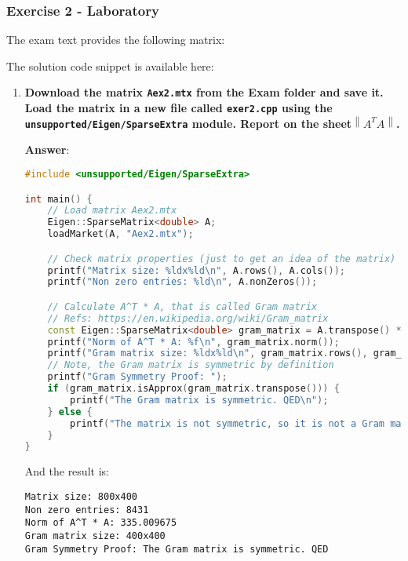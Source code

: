 \newpage

\subsubsection*{Exercise 2 - Laboratory}

The exam text provides the following matrix:
\begin{center}
\end{center}
The solution code snippet is available here:
\begin{center}
\end{center}
\begin{enumerate}[label=\textcolor{Green3}{\textbf{\arabic*.}}]
    \item \textcolor{Green3}{\textbf{%
        Download the matrix \texttt{Aex2.mtx} from the Exam folder and save it. Load the matrix in a new file called \texttt{exer2.cpp} using the \texttt{unsupported/Eigen/SparseExtra} module. Report on the sheet\break $\left\| A^{T} A \right\|$.
    }}

    \textbf{Answer}:
    \begin{lstlisting}[language=C++]
#include <unsupported/Eigen/SparseExtra>

int main() {
    // Load matrix Aex2.mtx
    Eigen::SparseMatrix<double> A;
    loadMarket(A, "Aex2.mtx");

    // Check matrix properties (just to get an idea of the matrix)
    printf("Matrix size: %ldx%ld\n", A.rows(), A.cols());
    printf("Non zero entries: %ld\n", A.nonZeros());

    // Calculate A^T * A, that is called Gram matrix
    // Refs: https://en.wikipedia.org/wiki/Gram_matrix
    const Eigen::SparseMatrix<double> gram_matrix = A.transpose() * A;
    printf("Norm of A^T * A: %f\n", gram_matrix.norm());
    printf("Gram matrix size: %ldx%ld\n", gram_matrix.rows(), gram_matrix.cols());
    // Note, the Gram matrix is symmetric by definition
    printf("Gram Symmetry Proof: ");
    if (gram_matrix.isApprox(gram_matrix.transpose())) {
        printf("The Gram matrix is symmetric. QED\n");
    } else {
        printf("The matrix is not symmetric, so it is not a Gram matrix\n");
    }
}\end{lstlisting}
    And the result is:
    \begin{lstlisting}
Matrix size: 800x400
Non zero entries: 8431
Norm of A^T * A: 335.009675
Gram matrix size: 400x400
Gram Symmetry Proof: The Gram matrix is symmetric. QED\end{lstlisting}



\end{enumerate}
